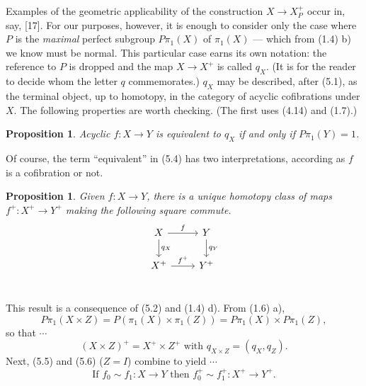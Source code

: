 \documentclass[openany,leqno]{book}  %
\newtheorem{prop}[theorem]{Proposition}
\begin{document}
Examples of the geometric applicability of the construction $X\longrightarrow X_P^+$ occur in, say, [17]. For our purposes, however, it is enough to consider only the case where $P$ is the {\em maximal} perfect subgroup $P\pi_1(X)$ of $\pi_1(X)$ --- which from (1.4) b) we know must be normal. This particular case earns its own notation: the reference to $P$ is dropped and the map $X \longrightarrow X^+$ is called $q_X$. (It is for the reader to decide whom the letter $q$ commemorates.) $q_X$ may be described, after (5.1), as the terminal object, up to homotopy, in the category of acyclic cofibrations under $X$. The following properties are worth checking. (The first uses (4.14) and (1.7).)
\begin{prop}
	Acyclic $f\colon   X \longrightarrow Y$ is equivalent to $q_X$ if and only if $P\pi_1(Y) = 1$.
\end{prop}
Of course, the term ``equivalent'' in (5.4) has two interpretations, according as $f$ is a cofibration or not.
\begin{prop}
	Given $f \colon   X \longrightarrow Y$, there is a unique homotopy class of maps $f^+ \colon  X^+ \longrightarrow Y^+$ making the following square commute.
\[
 \begin{tikzcd}
 X \arrow{d}{q_X} \arrow{r}{f}  & Y \arrow{d}{q_Y}\\
 X^+ \arrow{r}{f^+} & Y^+\\
 \end{tikzcd}
 \]
\end{prop}
This result is a consequence of (5.2) and (1.4) d). From (1.6) a),
\[P\pi_1(X\times Z)=P(\pi_1(X)\times \pi_1(Z))=P\pi_1(X)\times P\pi_1(Z), \]
so that $\cdots$
\begin{equation}
	(X\times Z)^+ = X^+ \times Z^+ \mbox{ with } q_{X\times Z} = (q_X, q_Z).
\end{equation}
Next, (5.5) and (5.6) ($Z = I$) combine to yield $\cdots$
\begin{equation}
 	\mbox{If } f_0 \sim f_1 \colon  X\longrightarrow Y \mbox{ then }f_0^+ \sim f_1^+ \colon  X^+ \longrightarrow Y^+.
 \end{equation} 
\end{document}
